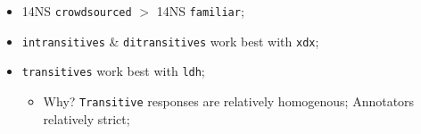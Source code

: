 \documentclass[handout,xcolor={dvipsnames}]{beamer}
\newcommand{\param}[1]{\texttt{#1}}
\begin{document}
\begin{frame}
\begin{itemize}
\pause
\item 14NS \param{crowdsourced} $>$ 14NS \param{familiar};
\pause
\item \param{intransitives} \& \param{ditransitives} work best with \param{xdx};
\pause
\item \param{transitives} work best with \param{ldh};
\begin{itemize}
\pause
\item Why? \param{Transitive} responses are relatively homogenous; Annotators relatively strict;
\end{itemize}
\end{itemize}



\end{frame}


\end{document}

